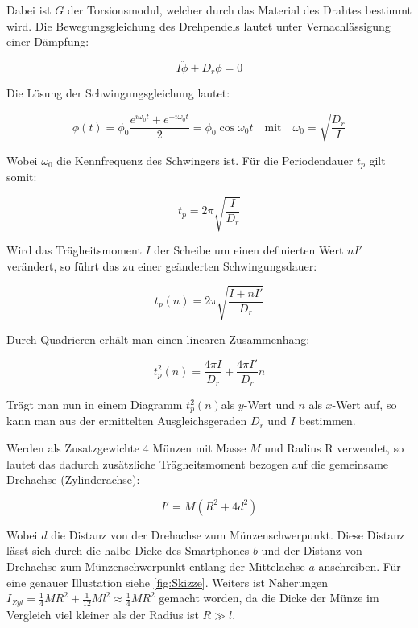 \documentclass[11pt,ngerman]{scrartcl}
\begin{document}
Dabei ist $G$ der Torsionsmodul, welcher durch das Material des Drahtes bestimmt wird. Die
Bewegungsgleichung des Drehpendels lautet unter Vernachlässigung einer Dämpfung:

\begin{equation}
    I \ddot \phi + D_r \phi = 0
\end{equation}

Die Lösung der Schwingungsgleichung lautet:

\begin{equation}
    \phi(t) = \phi_0 \frac{e^{i\omega_0t}+e^{-i\omega_0t}}{2}= \phi_0 \cos{\omega_0 t} \quad \text{mit} \quad \omega_0 = \sqrt{\frac{D_r}{I}} \label{eq:kennfreq}
\end{equation}

Wobei $\omega_0$ die Kennfrequenz des Schwingers ist.
Für die Periodendauer $t_p$ gilt somit:

\begin{equation}
    t_p = 2 \pi \sqrt{\frac{I}{D_r}}
\end{equation}

Wird das Trägheitsmoment $I$ der Scheibe um einen definierten Wert $n I'$
verändert, so führt das zu einer geänderten Schwingungsdauer:

\begin{equation}
    t_p(n) = 2 \pi \sqrt{\frac{I+nI'}{D_r}} 
\end{equation}

Durch Quadrieren erhält man einen linearen Zusammenhang:

\begin{equation}
    t_{p}^{2}(n) = \frac{4\pi I}{D_r} + \frac{4\pi I'}{D_r} n \label{eq:perioden_lin_reg}
\end{equation}

Trägt man nun in einem Diagramm $t_{p}^2(n)$als $y$-Wert und $n$ als $x$-Wert
auf, so kann man aus der ermittelten Ausgleichsgeraden $D_r$ und $I$ bestimmen.

Werden als Zusatzgewichte 4 Münzen mit Masse $M$ und Radius R
verwendet, so lautet das dadurch zusätzliche Trägheitsmoment
bezogen auf die gemeinsame Drehachse (Zylinderachse):

\begin{equation}
    I' = M (R^2+4 d^2) \label{eq:zusatzI}
\end{equation}

Wobei $d$ die Distanz von der Drehachse zum Münzenschwerpunkt. Diese Distanz
lässt sich durch die halbe Dicke des Smartphones $b$ und der Distanz von Drehachse 
zum Münzenschwerpunkt entlang der Mittelachse $a$ anschreiben. Für eine genauer Illustation
siehe \autoref{fig:Skizze}. Weiters ist Näherungen 
$I_{Zyl}=\frac{1}{4} M R^2 + \frac{1}{12} M l^2 \approx \frac{1}{4} M R^2$
gemacht worden, da die Dicke der Münze im Vergleich viel kleiner als der
Radius ist $R \gg l$.
\end{document}
